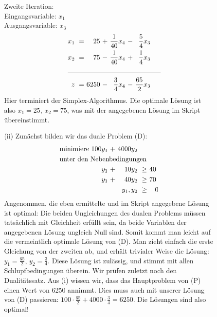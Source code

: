 \documentclass [a4paper,11pt]{article}
\begin{document}
\begin{enumerate}
\begin{enumerate}
\begin{enumerate}
                    Zweite Iteration:\\
                    Eingangsvariable: $x_1$\\
                    Ausgangsvariable: $x_3$
                    \begin{align*}
                    \begin{alignedat}{6}
                    && x_1 &\ = &\   25 &\ + &\ \frac{1}{40}x_4 &\ - &\ \frac{5}{4}x_3 \\
                    && x_2 &\ = &\   75 &\ - &\ \frac{1}{40}x_4 &\ + &\ \frac{1}{4}x_3 \\
                    &\rlap{\rule{4.8cm}{.1pt}} &&&&&&&\\
                    && z   &\ = &\ 6250 &\ - &\  \frac{3}{4}x_4 &\ - &\ \frac{65}{2}x_3
                    \end{alignedat}
                    \end{align*}
                    Hier terminiert der Simplex-Algorithmus. Die optimale Lösung ist also $x_1 = 25$, $x_2 = 75$, was mit der angegebenen
                    Lösung im Skript übereinstimmt.

                \item[(ii)]
                    Zunächst bilden wir das duale Problem (D):
                    \begin{align*}
                    \begin{alignedat}{6}
                    & \text{minimiere } & 100y_1 &\ + &\ 4000y_2 & & \\
                    & \rlap{unter den Nebenbedingungen} & & & & & \\
                    && y_1 &\ + &\ 10y_2 &\ \geq &\  40\ \\
                    && y_1 &\ + &\ 40y_2 &\ \geq &\  70\ \\
                    && & & \llap{$y_1,y_2$} &\ \geq &\ 0
                    \end{alignedat}
                    \end{align*}
                    Angenommen, die eben ermittelte und im Skript angegebene Lösung ist optimal: Die beiden Ungleichungen des dualen Problems
                    müssen tatsächlich mit Gleichheit erfüllt sein, da beide Variablen der angegebenen Lösung ungleich Null sind.
                    Somit kommt man leicht auf die vermeintlich optimale Lösung von (D). Man zieht einfach die erste Gleichung von der zweiten ab,
                    und erhält trivialer Weise die Lösung: $y_1 = \frac{65}{2}$, $y_2 = \frac{3}{4}$.
                    Diese Lösung ist zulässig, und stimmt mit allen Schlupfbedingungen überein. Wir prüfen zuletzt noch den Dualitätssatz. Aus (i)
                    wissen wir, dass das Hauptproblem von (P) einen Wert von 6250 annimmt. Dies muss auch mit unserer Lösung von (D) passieren:
                    $100 \cdot \frac{65}{2} + 4000 \cdot \frac{3}{4} = 6250$. Die Lösungen sind also optimal!


\end{enumerate}
\end{enumerate}
\end{enumerate}
\end{document}
